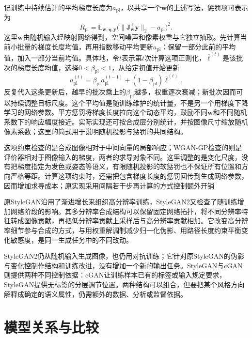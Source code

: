 记训练中持续估计的平均梯度长度为$a_{\mathrm{pl}}$，以共享一个$\bm{w}$的上述写法，惩罚项可表示为
\begin{equation}
  \label{eq:neural-generative-stylegan-path-regularization}
  R_{\mathrm{pl}}
    =\mathbb{E}_{\bm{w},\bm{\eta},\bm{y}}
       \bigl(\lVert\bm{J}_{\bm{w}}^{\top}\bm{y}\rVert_2
               -a_{\mathrm{pl}}\bigr)^2.
\end{equation}
这里$\bm{w}$由随机输入经映射网络得到，空间噪声和像素权重与它独立抽取。先计算当前小批量的梯度长度均值，再用指数移动平均更新$a_{\mathrm{pl}}$：保留一部分此前的平均值，加入一部分当前均值。具体地，令$t$表示第$t$次计算这项正则化，$\overline{\ell}^{(t)}$是该批次的梯度长度均值，选择$0<\beta_{\mathrm{pl}}<1$，从给定初值开始更新
\[
  a_{\mathrm{pl}}^{(t)}
    =\beta_{\mathrm{pl}}a_{\mathrm{pl}}^{(t-1)}
       +(1-\beta_{\mathrm{pl}})\overline{\ell}^{(t)}.
\]
反复代入这条更新后，越早的批次乘上的$\beta_{\mathrm{pl}}$越多，权重逐次衰减；新批次因而可以持续调整目标尺度。这个平均值是随训练维护的统计量，不是另一个用梯度下降学习的网络参数。平方惩罚将梯度长度拉向这个动态平均，鼓励不同$\bm{w}$和不同随机系数下的响应幅度接近。实际实现还可按合成层分别统计，并按图像尺寸缩放随机像素系数；这里的简式用于说明随机投影与惩罚的共同结构。

这项约束检查的是合成图像相对于中间向量的局部响应；WGAN-GP检查的则是评价器相对于图像输入的梯度，两者的求导对象不同。这里调整的是变化尺度，没有把梯度指定为发色或姿态等语义，有限随机投影的软惩罚也不保证所有位置和方向严格等距。计算这项约束时，还需把包含梯度长度的惩罚回传到生成网络参数，因而增加求导成本；原实现采用间隔若干步再计算的方式控制额外开销

原StyleGAN沿用了渐进增长来组织高分辨率训练，StyleGAN2又检查了随训练增加网络阶段的影响。其多分辨率合成结构可以保留固定网络拓扑，将不同分辨率特征转成图像贡献，再把低分辨率贡献上采样后与高分辨率贡献相加。它改变高分辨率细节参与合成的方式，与用权重解调制减少归一化伪影、用路径长度约束平衡变化敏感度，是同一生成任务中的不同改动。

StyleGAN2仍从随机输入生成图像，也仍用对抗训练；它针对原StyleGAN的伪影与变化控制作结构和训练改进，没有增加一个新的输出任务。StyleGAN与cGAN则提供两种不同控制依据：cGAN让训练样本已有的标签或输入规定要求，StyleGAN提供无标签的分层调节位置。两种结构可以组合，但要把某个风格方向解释成确定的语义属性，仍需额外的数据、分析或监督依据。

\section{模型关系与比较}
\label{sec:neural-generative-comparison}

